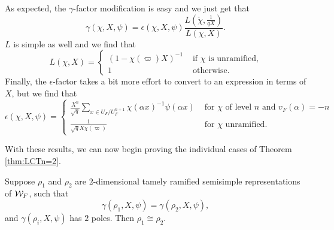 As expected, the $\gamma$-factor modification is easy and we just get that \[\gamma(\chi, X, \psi) = \epsilon(\chi, X, \psi) \frac{L(\check{\chi}, \frac{1}{qX})}{L(\chi, X)}.\]
$L$ is simple as well and we find that 
\[L(\chi, X) = \begin{cases} (1 - \chi(\varpi) X)^{-1} & \text{ if } \chi \text{ is unramified,} \\ 1 & \text{ otherwise.} \end{cases}\]
Finally, the $\epsilon$-factor takes a bit more effort to convert to an expression in terms of $X$, but we find that
\[\displaystyle\epsilon(\chi, X, \psi) = \begin{cases} \frac{X^n}{\sqrt{q}} \sum_{x \in U_F/U_F^{n+1}} \chi(\alpha x)^{-1} \psi(\alpha x) & \text{ for } \chi \text{ of level } n \text{ and } v_F(\alpha) = -n \\ \frac{1}{\sqrt{q}X\chi(\varpi)} & \text{ for } \chi \text{ unramified.}\end{cases}\]



With these results, we can now begin proving the individual cases of Theorem \ref{thm:LCTn=2}.

\begin{lemma}
  \label{lem:gamma-two-poles}
  Suppose $\rho_1$ and $\rho_2$ are $2$-dimensional tamely ramified semisimple representations of $\mathcal{W}_F$, such that
  \[\gamma(\rho_1,X,\psi) = \gamma(\rho_2,X,\psi),\]
  and $\gamma(\rho_i,X,\psi)$ has $2$ poles.
  Then $\rho_1 \cong \rho_2$.
\end{lemma}

